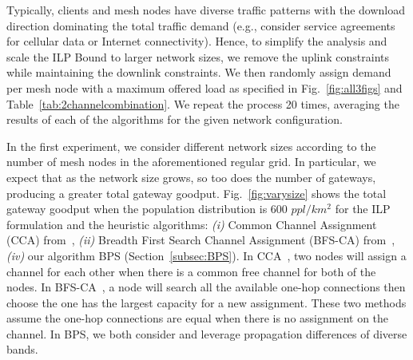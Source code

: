 
Typically, clients and mesh nodes have diverse traffic patterns with
the download direction dominating the total traffic demand (e.g., consider
service agreements for cellular data or Internet connectivity). Hence, to
simplify the analysis and scale the ILP Bound to larger network sizes, we 
remove the uplink constraints while maintaining the downlink constraints.
We then randomly assign demand per mesh node with a maximum offered load
as specified in Fig.~\ref{fig:all3figs} and Table~\ref{tab:2channelcombination}.
We repeat the process 20 times, averaging the results of each of the
algorithms for the given network configuration.

In the first experiment, we consider different network sizes according to
the number of mesh nodes in the aforementioned regular grid. In particular,
we expect that as the network size grows, so too does the number of gateways,
producing a greater total gateway goodput. Fig.~\ref{fig:varysize} shows
the total gateway goodput when the 
population distribution is 600 $ppl/km^2$
for the ILP formulation and the heuristic algorithms: 
{\it (i)} Common Channel Assignment (CCA) from~\cite{draves2004routing},
{\it (ii)} Breadth First Search Channel Assignment (BFS-CA) from~\cite{ramachandran2006interference},
{\it (iv)} our algorithm BPS (Section~\ref{subsec:BPS}).
In CCA~\cite{draves2004routing}, two nodes will assign a channel for each other when there is a common
free channel for both of the nodes. In BFS-CA~\cite{tang2005interference}, a node will search all the 
available one-hop connections then choose the one has the largest capacity for a new assignment. 
These two methods assume the one-hop connections are equal when there is no assignment on the channel. 
In BPS, we both consider and leverage propagation differences of diverse bands.

